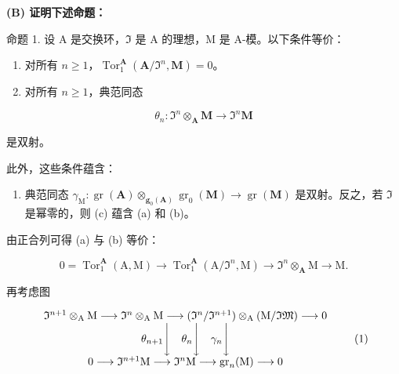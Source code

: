 \textbf{(B) 证明下述命题：}\par

命题 1. 设 A 是交换环，\(\mathfrak{I}\) 是 A 的理想，M 是 A-模。以下条件等价：

\begin{enumerate}
\def\labelenumi{(\alph{enumi})}
\item
  对所有 \(n \geqslant 1\)，\(\operatorname{Tor}_1^{\mathbf{A}}(\mathbf{A}/\mathfrak{I}^n, \mathbf{M}) = 0\)。
\item
  对所有 \(n \geqslant 1\)，典范同态
\end{enumerate}

\[
\theta_ {n} \colon \mathfrak {I} ^ {n} \otimes_ {\mathbf {A}} \mathbf {M} \rightarrow \mathfrak {I} ^ {n} \mathbf {M}
\]

是双射。

此外，这些条件蕴含：

\begin{enumerate}
\def\labelenumi{(\alph{enumi})}
\setcounter{enumi}{2}
\tightlist
\item
  典范同态 \(\gamma_{\mathrm{M}}: \operatorname{gr}(\mathbf{A}) \otimes_{\mathbf{g}_{0}(\mathbf{A})} \operatorname{gr}_{0}(\mathbf{M}) \to \operatorname{gr}(\mathbf{M})\) 是双射。反之，若 \(\Im\) 是幂零的，则 (c) 蕴含 (a) 和 (b)。
\end{enumerate}

由正合列可得 (a) 与 (b) 等价：

\[
0 = \operatorname{Tor} _ {1} ^ {\mathbf {A}} (\mathrm{A}, \mathrm{M}) \rightarrow \operatorname{Tor} _ {1} ^ {\mathbf {A}} (\mathrm{A} / \Im^ {n}, \mathrm{M}) \rightarrow \Im^ {n} \otimes_ {\mathbf {A}} \mathrm{M} \rightarrow \mathrm{M}.
\]

再考虑图

\[
\begin{array}{c} \mathfrak {I} ^ {n + 1} \otimes_ {\mathrm{A}} \mathrm{M} \longrightarrow \mathfrak {I} ^ {n} \otimes_ {\mathrm{A}} \mathrm{M} \longrightarrow (\mathfrak {I} ^ {n} / \mathfrak {I} ^ {n + 1}) \otimes_ {\mathrm{A}} (\mathrm{M} / \mathfrak {I M}) \longrightarrow 0 \\ \theta_ {n + 1} \Bigg \downarrow \quad \theta_ {n} \Bigg \downarrow \quad \gamma_ {n} \Bigg \downarrow \\ 0 \longrightarrow \mathfrak {I} ^ {n + 1} \mathrm{M} \longrightarrow \mathfrak {I} ^ {n} \mathrm{M} \longrightarrow \operatorname{gr} _ {n} (\mathrm{M}) \longrightarrow 0 \end{array}\tag{1}
\]

